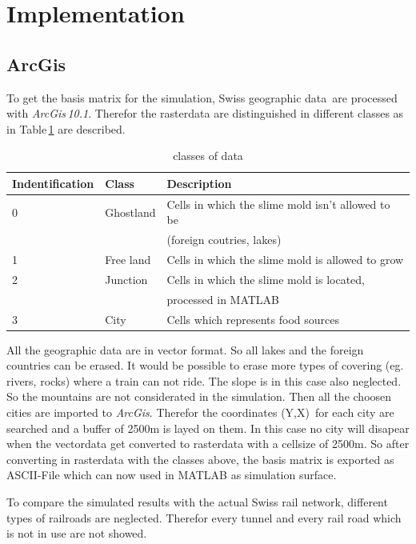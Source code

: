 \documentclass[11pt]{scrartcl}
\begin{document}
\section{Implementation}
\subsection{ArcGis}
\label{sec:arcgis}

To get the basis matrix for the simulation, Swiss geographic data\,\cite{gis_data} are processed with \textit{ArcGis\,10.1}. Therefor the rasterdata are distinguished in different classes as in Table\,\ref{tab:class} are described.

\begin{table}[H]
	\centering
	\caption{classes of data}
		\begin{tabular}{lll}
		\toprule
		Indentification & Class & Description \\
		\midrule
		0 & Ghostland & Cells in which the slime mold isn't allowed to be\\
		& 		& (foreign coutries, lakes)\\
		1 & Free land & Cells in which the slime mold is allowed to grow\\
		2 & Junction & Cells in which the slime mold is located, \\
		& & processed in MATLAB\\
		3 & City & Cells which represents food sources\\
		\bottomrule
	\end{tabular}
\label{tab:class}
\end{table}

All the geographic data are in vector format. So all lakes and the foreign countries can be erased. It would be possible to erase more types of covering (eg. rivers, rocks) where a train can not ride. The slope is in this case also neglected. So the mountains are not considerated in the simulation. Then all the choosen cities are imported to \textit{ArcGis}. Therefor the coordinates (Y,X)\,\cite{coordinates} for each city are searched and a buffer of 2500m is layed on them. In this case no city will disapear when the vectordata get converted to rasterdata with a cellsize of 2500m. So after converting in rasterdata with the classes above, the basis matrix is exported as ASCII-File which can now used in MATLAB as simulation surface.

To compare the simulated results with the actual Swiss rail network, different types of railroads are neglected. Therefor every tunnel and every rail road which is not in use are not showed.
\end{document}
